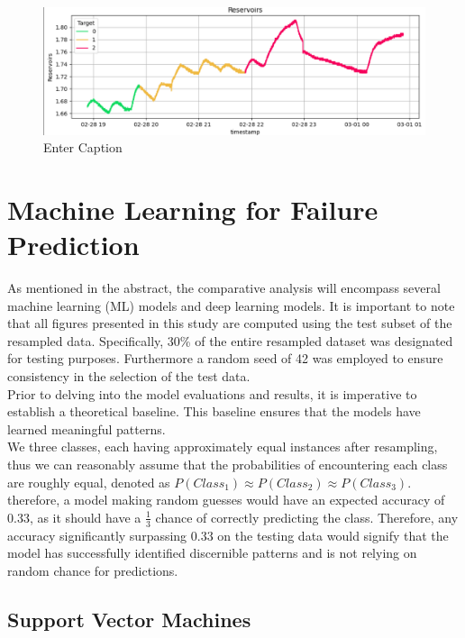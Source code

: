 \documentclass{article}
\begin{document}
\begin{figure}
    \centering
    \includegraphics[width=1\linewidth]{EDA_Res.png}
    \caption{Enter Caption}
    \label{fig:enter-label}
\end{figure}

\section{Machine Learning for Failure Prediction}

As mentioned in the abstract, the comparative analysis will encompass several machine learning (ML) models and deep learning models. It is important to note that all figures presented in this study are computed using the test subset of the resampled data. Specifically, 30\% of the entire resampled dataset was designated for testing purposes. Furthermore a random seed of 42 was employed to ensure consistency in the selection of the test data. \\

Prior to delving into the model evaluations and results, it is imperative to establish a theoretical baseline. This baseline ensures that the models have learned meaningful patterns. \\

We three classes, each having approximately equal instances after resampling, thus we can reasonably assume that the probabilities of encountering each class are roughly equal, denoted as $P(Class_1) \approx P(Class_2) \approx P(Class_3)$. therefore, a model making random guesses would have an expected accuracy of 0.33, as it should have a $\frac{1}{3}$ chance of correctly predicting the class. Therefore, any accuracy significantly surpassing 0.33 on the testing data would signify that the model has successfully identified discernible patterns and is not relying on random chance for predictions.\\

\subsection{Support Vector Machines}
\end{document}

